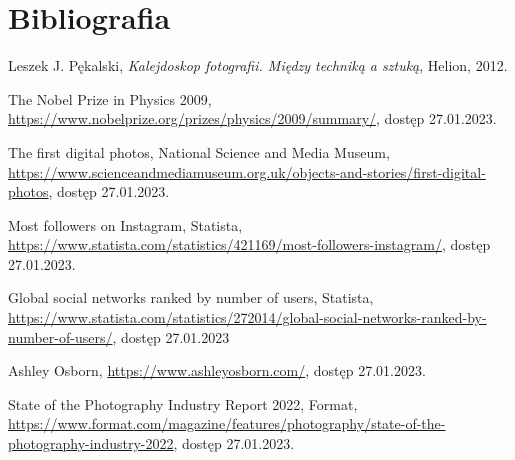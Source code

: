\documentclass[12pt]{article}
\numberwithin{figure}{section}
\begin{document}
\begin{sloppypar}

\newpage 

%
    \listoftables
    \clearpage


\newpage 

%
    \listofcodes
    \clearpage


\newpage 

\section*{Bibliografia}
    \renewcommand{\section}[2]{}
    
\begin{thebibliography}{99}

    Leszek J. Pękalski,
    \textit{Kalejdoskop fotografii. Między techniką a sztuką},
    Helion,
    2012.

    The Nobel Prize in Physics 2009,
    \url{https://www.nobelprize.org/prizes/physics/2009/summary/}, 
    dostęp 27.01.2023.

    The first digital photos, National Science and Media Museum,
    \url{https://www.scienceandmediamuseum.org.uk/objects-and-stories/first-digital-photos},
    dostęp 27.01.2023.

    Most followers on Instagram, Statista,
    \url{https://www.statista.com/statistics/421169/most-followers-instagram/},
    dostęp 27.01.2023.

    Global social networks ranked by number of users, Statista,
    \url{https://www.statista.com/statistics/272014/global-social-networks-ranked-by-number-of-users/},
    dostęp 27.01.2023

    Ashley Osborn,
    \url{https://www.ashleyosborn.com/},
    dostęp 27.01.2023.

    State of the Photography Industry Report 2022, Format,
    \url{https://www.format.com/magazine/features/photography/state-of-the-photography-industry-2022},
    dostęp 27.01.2023.


\end{thebibliography}
\end{sloppypar}
\end{document}
